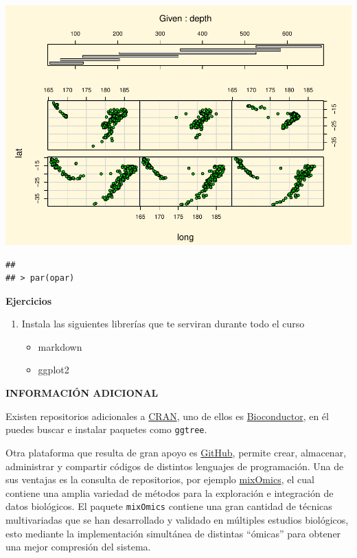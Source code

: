 \documentclass[
]{book}
\providecommand{\tightlist}{%
  \setlength{\itemsep}{0pt}\setlength{\parskip}{0pt}}
\begin{document}
\includegraphics{bookdown-demo_files/figure-latex/unnamed-chunk-6-11.pdf}

\begin{verbatim}
## 
## > par(opar)
\end{verbatim}

\textbf{Ejercicios}

\begin{enumerate}
\def\labelenumi{\arabic{enumi}.}
\tightlist
\item
  Instala las siguientes librerías que te serviran durante todo el curso

  \begin{itemize}
  \tightlist
  \item
    markdown
  \item
    ggplot2
  \end{itemize}
\end{enumerate}

\textbf{INFORMACIÓN ADICIONAL}

Existen repositorios adicionales a \href{https://cran.r-project.org/}{CRAN}, uno de ellos es \href{https://https://bioconductor.org/}{Bioconductor}, en él puedes buscar e instalar paquetes como \texttt{ggtree}.

Otra plataforma que resulta de gran apoyo es \href{https://docs.github.com/es}{GitHub}, permite crear, almacenar, administrar y compartir códigos de distintos lenguajes de programación. Una de sus ventajas es la consulta de repositorios, por ejemplo \href{https://github.com/mixOmicsTeam/mixOmics}{mixOmics}, el cual contiene una amplia variedad de métodos para la exploración e integración de datos biológicos. El paquete \texttt{mixOmics} contiene una gran cantidad de técnicas multivariadas que se han desarrollado y validado en múltiples estudios biológicos, esto mediante la implementación simultánea de distintas ``ómicas'' para obtener una mejor compresión del sistema.
\end{document}
